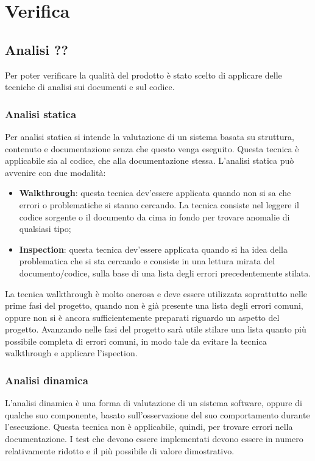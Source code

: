 \documentclass[../NormeProgetto.tex]{subfiles}
\begin{document}
	\section{Verifica}
		\subsection{Analisi ??}
		Per poter verificare la qualità del prodotto è stato scelto di applicare delle tecniche di analisi sui documenti e sul codice. 
			\subsubsection{Analisi statica} Per analisi statica si intende la valutazione di un sistema basata su struttura, contenuto e documentazione senza che questo venga eseguito. Questa tecnica è applicabile sia al codice, che alla documentazione stessa. L'analisi statica può avvenire con due modalità:
			\begin{itemize}
				\item \textbf{Walkthrough}: questa tecnica dev'essere applicata quando non si sa che errori o problematiche si stanno cercando. La tecnica consiste nel leggere il codice sorgente o il documento da cima in fondo per trovare anomalie  di qualsiasi tipo;
				\item \textbf{Inspection}: questa tecnica dev'essere applicata quando si ha idea della problematica che si sta cercando e consiste in una lettura mirata del documento/codice, sulla base di una lista degli errori precedentemente stilata.
			\end{itemize}
			La tecnica walkthrough è molto onerosa e deve essere utilizzata soprattutto nelle prime fasi del progetto, quando non è già presente una lista degli errori comuni, oppure non si è ancora sufficientemente preparati riguardo un aspetto del progetto. Avanzando nelle fasi del progetto sarà utile stilare una lista quanto più possibile completa di errori comuni, in modo tale da evitare la tecnica walkthrough e applicare l'ispection.
			
			\subsubsection{Analisi dinamica}
			L’analisi dinamica è una forma di valutazione di un sistema software, oppure di qualche suo componente, basato sull'osservazione del suo comportamento durante l'esecuzione. Questa tecnica non è applicabile, quindi, per trovare errori nella documentazione. I test che devono essere implementati devono essere in numero relativamente ridotto e il più possibile di valore dimostrativo.
			
\end{document}
